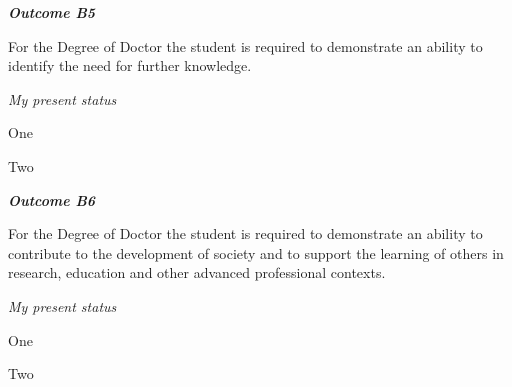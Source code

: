 \vspace{1em}
\hfill\begin{minipage}{\dimexpr\textwidth-1cm}
\noindent \textbf{\emph{Outcome B5}}

\noindent For the Degree of Doctor the student is required to demonstrate an ability to identify the need for further knowledge. \\

\xdef\tpd{\the\prevdepth}

\end{minipage}

\noindent \emph{My present status}
\begin{outcomes}
    \item One
    \item Two
\end{outcomes}

















\vspace{1em}
\hfill\begin{minipage}{\dimexpr\textwidth-1cm}
\noindent \textbf{\emph{Outcome B6}}

\noindent For the Degree of Doctor the student is required to demonstrate an ability to contribute to the development of society and to support the learning of others in research, education and other advanced professional contexts.\\

\xdef\tpd{\the\prevdepth}

\end{minipage}

\noindent \emph{My present status}
\begin{outcomes}
    \item One
    \item Two
\end{outcomes}

















